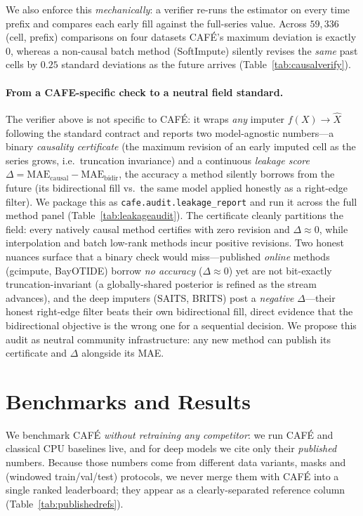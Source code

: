 \documentclass[10pt,twocolumn]{article}
\newcommand{\cafe}{CAF\'E}
\begin{document}
We also enforce this \emph{mechanically}: a verifier re-runs the estimator on
every time prefix and compares each early fill against the full-series value.
Across $59{,}336$ (cell, prefix) comparisons on four datasets \cafe{}'s maximum
deviation is exactly $0$, whereas a non-causal batch method (SoftImpute)
silently revises the \emph{same} past cells by $0.25$ standard deviations as the
future arrives (Table~\ref{tab:causalverify}).


\paragraph{From a CAFE-specific check to a neutral field standard.} The verifier above
is not specific to \cafe{}: it wraps \emph{any} imputer $f(X)\!\to\!\hat X$ following the
standard contract and reports two model-agnostic numbers---a binary \emph{causality
certificate} (the maximum revision of an early imputed cell as the series grows, i.e.\
truncation invariance) and a continuous \emph{leakage score}
$\Delta=\mathrm{MAE}_{\text{causal}}-\mathrm{MAE}_{\text{bidir}}$, the accuracy a method
silently borrows from the future (its bidirectional fill vs.\ the same model applied
honestly as a right-edge filter). We package this as \texttt{cafe.audit.leakage\_report}
and run it across the full method panel (Table~\ref{tab:leakageaudit}). The certificate
cleanly partitions the field: every natively causal method certifies with zero revision
and $\Delta\!\approx\!0$, while interpolation and batch low-rank methods incur positive
revisions. Two honest nuances surface that a binary check would miss---published
\emph{online} methods (gcimpute, BayOTIDE) borrow \emph{no accuracy}
($\Delta\!\approx\!0$) yet are not bit-exactly truncation-invariant (a globally-shared
posterior is refined as the stream advances), and the deep imputers (SAITS, BRITS) post a
\emph{negative} $\Delta$---their honest right-edge filter beats their own bidirectional
fill, direct evidence that the bidirectional objective is the wrong one for a sequential
decision. We propose this audit as neutral community infrastructure: any new method can
publish its certificate and $\Delta$ alongside its MAE.


\section{Benchmarks and Results}\label{sec:exp}
We benchmark \cafe{} \emph{without retraining any competitor}: we run \cafe{} and
classical CPU baselines live, and for deep models we cite only their
\emph{published} numbers. Because those numbers come from different data variants,
masks and (windowed train/val/test) protocols, we never merge them with \cafe{}
into a single ranked leaderboard; they appear as a clearly-separated reference
column (Table~\ref{tab:publishedrefs}).
\end{document}
